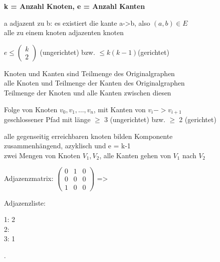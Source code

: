 \textbf{k = Anzahl Knoten, e = Anzahl Kanten}

a adjazent zu b: es existiert die kante a->b, also $(a,b) \in E$\\
 alle zu einem knoten adjazenten knoten

$e \leq \left( \! \begin{array}{c}k \\ 2\end{array} \! \right)$ (ungerichtet) bzw. $\leq k(k-1)$(gerichtet)



 Knoten und Kanten sind Teilmenge des Originalgraphen\\
 alle Knoten und Teilmenge der Kanten des Originalgraphen\\
 Teilmenge der Knoten und alle Kanten zwischen diesen

 Folge von Knoten $v_0,v_1,\dots,v_n$, mit Kanten von $v_i -> v_{i+1}$\\
 geschlossener Pfad mit länge $\geq$ 3 (ungerichtet) bzw. $\geq$ 2 (gerichtet)

 alle gegenseitig erreichbaren knoten bilden Komponente\\
 zusammenhängend, azyklisch und e = k-1\\
 zwei Mengen von Knoten $V_1, V_2$, alle Kanten gehen von $V_1$ nach $V_2$

Adjazenzmatrix: $\left(
\begin{matrix}
0 & 1& 0\\
0 & 0 & 0 \\
1 & 0 & 0 
\end{matrix}
 \right)$ => 
\begin{minipage}{0.1\textwidth}
\end{minipage}
Adjazenzliste: 
\begin{minipage}[c]{0.1\textwidth}
1: 2\\
2:\\
3: 1 \\
\end{minipage}.

